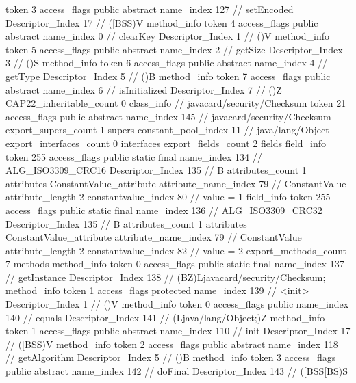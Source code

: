 {{{{{					token	3
					access_flags	public abstract
					name_index	127		// setEncoded
					Descriptor_Index	17		// ([BSS)V
				}
				method_info {
					token	4
					access_flags	public abstract
					name_index	0		// clearKey
					Descriptor_Index	1		// ()V
				}
				method_info {
					token	5
					access_flags	public abstract
					name_index	2		// getSize
					Descriptor_Index	3		// ()S
				}
				method_info {
					token	6
					access_flags	public abstract
					name_index	4		// getType
					Descriptor_Index	5		// ()B
				}
				method_info {
					token	7
					access_flags	public abstract
					name_index	6		// isInitialized
					Descriptor_Index	7		// ()Z
				}
			}
			CAP22_inheritable_count	0
		}
		class_info {		// javacard/security/Checksum
			token	21
			access_flags	public abstract
			name_index	145		// javacard/security/Checksum
			export_supers_count	1
			supers {
				constant_pool_index	11		// java/lang/Object
			}
			export_interfaces_count	0
			interfaces {
			}
			export_fields_count	2
			fields {
			field_info {
				token	255
				access_flags	public static final
				name_index	134		// ALG_ISO3309_CRC16
				Descriptor_Index	135		// B
				attributes_count	1
				attributes {
				ConstantValue_attribute {
					attribute_name_index	79		// ConstantValue
					attribute_length	2
					constantvalue_index	80		// value = 1
				}
				}
			}
			field_info {
				token	255
				access_flags	public static final
				name_index	136		// ALG_ISO3309_CRC32
				Descriptor_Index	135		// B
				attributes_count	1
				attributes {
				ConstantValue_attribute {
					attribute_name_index	79		// ConstantValue
					attribute_length	2
					constantvalue_index	82		// value = 2
				}
				}
			}
			}
			export_methods_count	7
			methods {
				method_info {
					token	0
					access_flags	public static final
					name_index	137		// getInstance
					Descriptor_Index	138		// (BZ)Ljavacard/security/Checksum;
				}
				method_info {
					token	1
					access_flags	protected
					name_index	139		// <init>
					Descriptor_Index	1		// ()V
				}
				method_info {
					token	0
					access_flags	public
					name_index	140		// equals
					Descriptor_Index	141		// (Ljava/lang/Object;)Z
				}
				method_info {
					token	1
					access_flags	public abstract
					name_index	110		// init
					Descriptor_Index	17		// ([BSS)V
				}
				method_info {
					token	2
					access_flags	public abstract
					name_index	118		// getAlgorithm
					Descriptor_Index	5		// ()B
				}
				method_info {
					token	3
					access_flags	public abstract
					name_index	142		// doFinal
					Descriptor_Index	143		// ([BSS[BS)S
}}}}}

